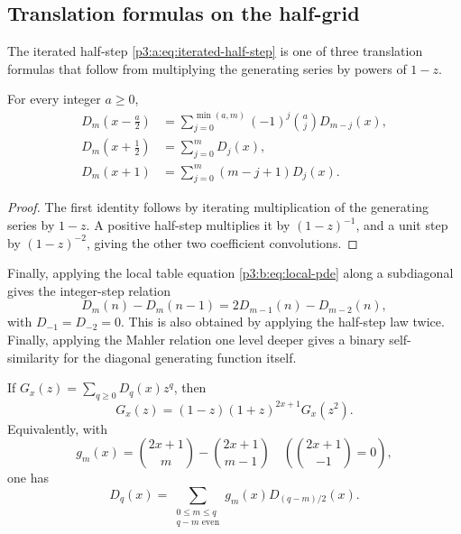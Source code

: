 \documentclass[11pt,oneside]{article}
\numberwithin{equation}{section}
\theoremstyle{definition}
\theoremstyle{remark}
\begin{document}
\subsection{Translation formulas on the half-grid}
The iterated half-step \eqref{p3:a:eq:iterated-half-step} is one of three
translation formulas that follow from multiplying the generating series by
powers of $1-z$.

\begin{corollary}
\label{p3:b:cor:translations}
For every integer $a\ge0$,
\begin{align}
 D_m\!\left(x-\frac a2\right)
 &=\sum_{j=0}^{\min(a,m)}(-1)^j\binom aj D_{m-j}(x),
 \label{p3:b:eq:negative-shift}\\
 D_m\!\left(x+\frac12\right)
 &=\sum_{j=0}^{m}D_j(x),
 \label{p3:b:eq:positive-half-shift}\\
 D_m(x+1)
 &=\sum_{j=0}^{m}(m-j+1)D_j(x).
 \label{p3:b:eq:unit-shift}
\end{align}
\end{corollary}

\begin{proof}
The first identity follows by iterating multiplication of the generating
series by $1-z$.  A positive half-step multiplies it by $(1-z)^{-1}$, and a
unit step by $(1-z)^{-2}$, giving the other two coefficient convolutions.
\end{proof}
Finally, applying the local table equation \eqref{p3:b:eq:local-pde} along a
subdiagonal gives the integer-step relation
\begin{equation}
 D_m(n)-D_m(n-1)
 =2D_{m-1}(n)-D_{m-2}(n),
 \label{p3:b:eq:diagonal-local}
\end{equation}
with $D_{-1}=D_{-2}=0$.  This is also obtained by applying the
half-step law twice.
Finally, applying the Mahler relation one level deeper gives a binary
self-similarity for the diagonal generating function itself.

\begin{proposition}
If \(G_x(z)=\sum_{q\geq0}D_q(x)z^q\), then
\begin{equation}
 \boxed{G_x(z)=(1-z)(1+z)^{2x+1}G_x(z^2).}                 \label{p3:c:eq:diag-mahler}
\end{equation}
Equivalently, with
\[
 g_m(x)=\binom{2x+1}{m}-\binom{2x+1}{m-1}
 \quad\left(\binom{2x+1}{-1}=0\right),
\]
one has
\begin{equation}
 D_q(x)=
 \sum_{\substack{0\leq m\leq q\\q-m\text{ even}}}
 g_m(x)D_{(q-m)/2}(x).                                 \label{p3:c:eq:binary-diag-rec}
\end{equation}
\end{proposition}
\end{document}
